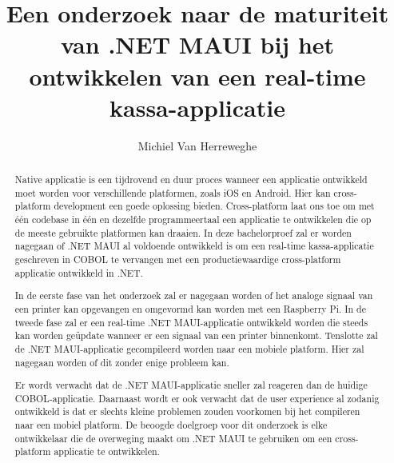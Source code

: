 \documentclass{hogent-article}
\title{Een onderzoek naar de maturiteit van .NET MAUI bij het ontwikkelen van een real-time kassa-applicatie}
\author{Michiel Van Herreweghe}
\begin{document}
\begin{abstract}
Native applicatie is een tijdrovend en duur proces wanneer een applicatie ontwikkeld moet worden voor verschillende platformen, zoals iOS en Android. Hier kan cross-platform development een goede oplossing bieden. Cross-platform laat ons toe om met één codebase in één en dezelfde programmeertaal een applicatie te ontwikkelen die op de meeste gebruikte platformen kan draaien. In deze bachelorproef zal er worden nagegaan of .NET MAUI al voldoende ontwikkeld is om een real-time kassa-applicatie geschreven in COBOL te vervangen met een productiewaardige cross-platform applicatie ontwikkeld in .NET.

In de eerste fase van het onderzoek zal er nagegaan worden of het analoge signaal van een printer kan opgevangen en omgevormd kan worden met een Raspberry Pi.
In de tweede fase zal er een real-time .NET MAUI-applicatie ontwikkeld worden die steeds kan worden geüpdate wanneer er een signaal van een printer binnenkomt.
Tenslotte zal de .NET MAUI-applicatie gecompileerd worden naar een mobiele platform. Hier zal nagegaan worden of dit zonder enige probleem kan.

Er wordt verwacht dat de .NET MAUI-applicatie sneller zal reageren dan de huidige COBOL-applicatie. Daarnaast wordt er ook verwacht dat de user experience al zodanig ontwikkeld is dat er slechts kleine problemen zouden voorkomen bij het compileren naar een mobiel platform.
De beoogde doelgroep voor dit onderzoek is elke ontwikkelaar die de overweging maakt om .NET MAUI te gebruiken om een cross-platform applicatie te ontwikkelen.
\end{abstract}

\tableofcontents


\pagebreak
\printbibliography[heading=bibintoc]
\end{document}
